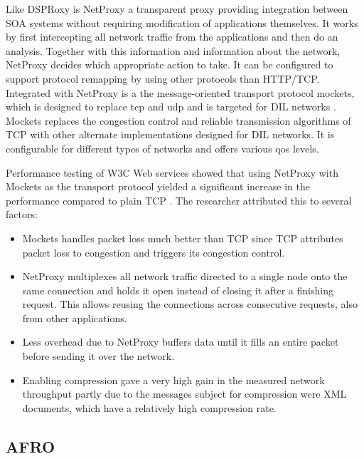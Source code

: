 Like DSPRoxy is NetProxy a transparent proxy providing integration between SOA
systems without requiring modification of applications themselves. It works by
first intercepting all network traffic from the applications and then do an analysis.
Together with this information and information about the network, NetProxy decides
which appropriate action to take. It can be
configured to support protocol remapping by using other protocols than HTTP/TCP.
Integrated with NetProxy is a the message-oriented transport protocol
\gls{mockets}, which is designed to replace \gls{tcp} and \gls{udp} and is
targeted for DIL networks \cite{suri-netproxy}. Mockets replaces the congestion
control and reliable transmission algorithms of TCP with other alternate
implementations designed for DIL networks. It is configurable for different
types of networks and offers various \gls{qos} levels.

Performance testing of W3C Web services showed that using NetProxy with Mockets as
the transport protocol yielded a significant increase in the performance
compared to plain TCP \cite{suri-netproxy}. The researcher attributed this to
several factors:

\begin{itemize}

    \item Mockets handles packet loss much better than TCP since TCP attributes
    packet loss to congestion and triggers its congestion control.

    \item NetProxy multiplexes all network traffic directed to a single node
    onto the same connection and holds it open instead of closing it after a
    finishing request. This allows reusing the connections across consecutive
    requests, also from other applications.

    \item Less overhead due to NetProxy buffers data until it fills an
    entire packet before sending it over the network.

    \item Enabling compression gave a very high gain in the measured network
    throughput partly due to the messages subject for compression were XML
    documents, which have a relatively high compression rate.

\end{itemize}

\subsection{AFRO}

